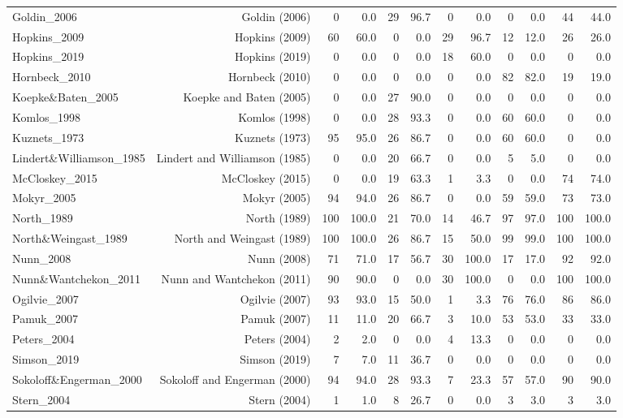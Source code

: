 \begin{table}[ht]
\begin{tabular}{lrrrrrrrrrrr}
Goldin\_2006 & Goldin (2006) & 0 & 0.0 & 29 & 96.7 & 0 & 0.0 & 0 & 0.0 & 44 & 44.0 \\
Hopkins\_2009 & Hopkins (2009) & 60 & 60.0 & 0 & 0.0 & 29 & 96.7 & 12 & 12.0 & 26 & 26.0 \\
Hopkins\_2019 & Hopkins (2019) & 0 & 0.0 & 0 & 0.0 & 18 & 60.0 & 0 & 0.0 & 0 & 0.0 \\
Hornbeck\_2010 & Hornbeck (2010) & 0 & 0.0 & 0 & 0.0 & 0 & 0.0 & 82 & 82.0 & 19 & 19.0 \\
Koepke\&Baten\_2005 & Koepke and Baten (2005) & 0 & 0.0 & 27 & 90.0 & 0 & 0.0 & 0 & 0.0 & 0 & 0.0 \\
Komlos\_1998 & Komlos (1998) & 0 & 0.0 & 28 & 93.3 & 0 & 0.0 & 60 & 60.0 & 0 & 0.0 \\
Kuznets\_1973 & Kuznets (1973) & 95 & 95.0 & 26 & 86.7 & 0 & 0.0 & 60 & 60.0 & 0 & 0.0 \\
Lindert\&Williamson\_1985 & Lindert and Williamson (1985) & 0 & 0.0 & 20 & 66.7 & 0 & 0.0 & 5 & 5.0 & 0 & 0.0 \\
McCloskey\_2015 & McCloskey (2015) & 0 & 0.0 & 19 & 63.3 & 1 & 3.3 & 0 & 0.0 & 74 & 74.0 \\
Mokyr\_2005 & Mokyr (2005) & 94 & 94.0 & 26 & 86.7 & 0 & 0.0 & 59 & 59.0 & 73 & 73.0 \\
North\_1989 & North (1989) & 100 & 100.0 & 21 & 70.0 & 14 & 46.7 & 97 & 97.0 & 100 & 100.0 \\
North\&Weingast\_1989 & North and Weingast (1989) & 100 & 100.0 & 26 & 86.7 & 15 & 50.0 & 99 & 99.0 & 100 & 100.0 \\
Nunn\_2008 & Nunn (2008) & 71 & 71.0 & 17 & 56.7 & 30 & 100.0 & 17 & 17.0 & 92 & 92.0 \\
Nunn\&Wantchekon\_2011 & Nunn and Wantchekon (2011) & 90 & 90.0 & 0 & 0.0 & 30 & 100.0 & 0 & 0.0 & 100 & 100.0 \\
Ogilvie\_2007 & Ogilvie (2007) & 93 & 93.0 & 15 & 50.0 & 1 & 3.3 & 76 & 76.0 & 86 & 86.0 \\
Pamuk\_2007 & Pamuk (2007) & 11 & 11.0 & 20 & 66.7 & 3 & 10.0 & 53 & 53.0 & 33 & 33.0 \\
Peters\_2004 & Peters (2004) & 2 & 2.0 & 0 & 0.0 & 4 & 13.3 & 0 & 0.0 & 0 & 0.0 \\
Simson\_2019 & Simson (2019) & 7 & 7.0 & 11 & 36.7 & 0 & 0.0 & 0 & 0.0 & 0 & 0.0 \\
Sokoloff\&Engerman\_2000 & Sokoloff and Engerman (2000) & 94 & 94.0 & 28 & 93.3 & 7 & 23.3 & 57 & 57.0 & 90 & 90.0 \\
Stern\_2004 & Stern (2004) & 1 & 1.0 & 8 & 26.7 & 0 & 0.0 & 3 & 3.0 & 3 & 3.0 \\

\end{tabular}
\end{table}
